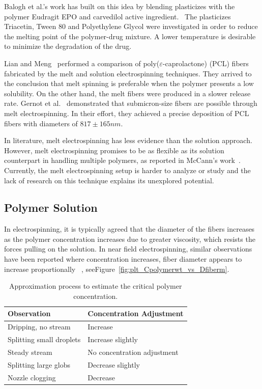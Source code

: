 Balogh et al.'s work has built on this idea by blending plasticizes with the polymer Eudragit EPO and carvedilol active ingredient.\unskip~\cite{527120:13445752} The plasticizes Triacetin, Tween 80 and Polyethylene Glycol were investigated in order to reduce the melting point of the polymer-drug mixture. A lower temperature is desirable to minimize the degradation of the drug.

Lian and Meng\unskip~\cite{527120:13445754} performed a comparison of poly(\ensuremath{\varepsilon }-caprolactone) (PCL) fibers fabricated by the melt and solution electrospinning techniques. They arrived to the conclusion that melt spinning is preferable when the polymer presents a low solubility. On the other hand, the melt fibers were produced in a slower release rate. Gernot et al.\unskip~\cite{527120:13534159} demonstrated that submicron-size fibers are possible through melt electrospinning. In their effort, they achieved a precise deposition of PCL fibers with diameters of $817 \pm 165 nm $. 

In literature, melt electrospinning has less evidence than the solution approach. However, melt electrospinning promises to be as flexible as its solution counterpart in handling multiple polymers, as reported in McCann's work\unskip~\cite{527120:13534572}. Currently, the melt electrospinning setup is harder to analyze or study and the lack of research on this technique explains its unexplored potential.



\subsection{Polymer Solution}In electrospinning, it is typically agreed that the diameter of the fibers increases as the polymer concentration increases due to greater viscosity, which resists the forces pulling on the solution. In near field electrospinning, similar observations have been reported where concentration increases, fiber diameter appears to increase proportionally \unskip~\cite{527120:11974306,527120:11974329}, seeFigure~\ref{fig:plt_Cpolymerwt_vs_Dfiberm}.
\begin{table}[!htbp]
\caption{Approximation process to estimate the critical polymer concentration.}
\label{tw-be3662f66502}
\def\arraystretch{1}
\ignorespaces 
\centering 
\begin{tabularx}{\textwidth}{ll}
\hline Observation & Concentration Adjustment\\
\hline 
Dripping, no stream &
  Increase\\
Splitting small droplets &
  Increase slightly\\
Steady stream &
  No concentration adjustment\\
Splitting large globs &
  Decrease slightly\\
Nozzle clogging &
  Decrease\\
\hline 
\end{tabularx}\par 
\end{table}



